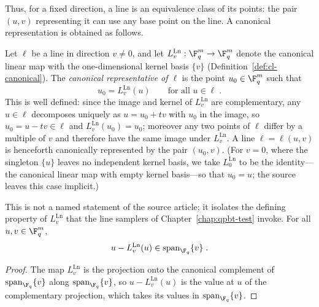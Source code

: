 Thus, for a fixed direction, a line is an equivalence class of its points: the
pair $(u,v)$ representing it can use any base point on the line. A canonical
representation is obtained as follows.

\begin{definition}\label{def:line-representative}
	Let $\ell$ be a line in direction $v \neq 0$, and let
	$L^{\mathrm{Ln}}_v : \F_q^m \to \F_q^m$ denote the canonical linear map with
	the one-dimensional kernel basis $\{v\}$
	(Definition~\ref{def:cl-canonical}). The \emph{canonical representative of
	$\ell$} is the point $u_0 \in \F_q^m$ such that
	\[
		u_0 = L^{\mathrm{Ln}}_v(u) \qquad \text{for all } u \in \ell\;.
	\]
	This is well defined: since the image and kernel of $L^{\mathrm{Ln}}_v$ are
	complementary, any $u \in \ell$ decomposes uniquely as $u = u_0 + tv$ with
	$u_0$ in the image, so $u_0 = u - tv \in \ell$ and
	$L^{\mathrm{Ln}}_v(u_0) = u_0$; moreover any two points of $\ell$ differ by
	a multiple of $v$ and therefore have the same image under
	$L^{\mathrm{Ln}}_v$. A line $\ell = \ell(u,v)$ is henceforth canonically
	represented by the pair $(u_0, v)$. (For $v = 0$, where the singleton
	$\{u\}$ leaves no independent kernel basis, we take $L^{\mathrm{Ln}}_0$ to
	be the identity---the canonical linear map with empty kernel basis---so
	that $u_0 = u$; the source leaves this case implicit.)
\end{definition}

\begin{lemma}\label{lem:line-rep-kernel}
	\leanok
	This is not a named statement of the source article; it isolates the defining property of $L^{\mathrm{Ln}}_v$ that the line samplers of Chapter~\ref{chap:qpbt-test} invoke. For all $u, v \in \F_q^m$,
	\[
		u - L^{\mathrm{Ln}}_v(u) \in \mathrm{span}_{\F_q}\{v\}\;.
	\]
\end{lemma}
\begin{proof}
	\leanok
	The map $L^{\mathrm{Ln}}_v$ is the projection onto the canonical complement of $\mathrm{span}_{\F_q}\{v\}$ along $\mathrm{span}_{\F_q}\{v\}$, so $u - L^{\mathrm{Ln}}_v(u)$ is the value at $u$ of the complementary projection, which takes its values in $\mathrm{span}_{\F_q}\{v\}$.
\end{proof}


